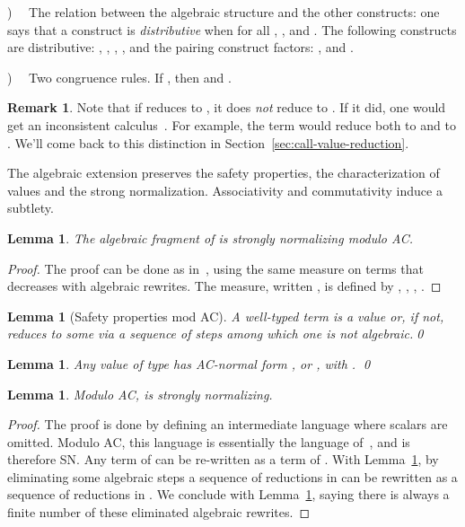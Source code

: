 \documentclass[10pt]{article}
\theoremstyle{plain}
\newtheorem{lemma}[theorem]{Lemma}
\theoremstyle{definition}
\newtheorem{remark}[theorem]{Remark}
\newcommand{\define}[1]{{\em #1}}
\begin{document}
\smallskip
{})~~
 The relation between the algebraic structure and the other
  constructs: one says that a construct  is
  \define{distributive} when for all , , 
   and 
  .
The following constructs are distributive:
,
,
,
,
and the pairing construct factors: 
, 
 and
.

\smallskip
{})~~
 Two congruence rules. If , then 
  and .

\begin{remark}\label{rem:red-strat}
  Note that if  reduces to
  , it does {\em not} reduce to
  . If it did, one would get an
  inconsistent calculus~\cite{ad08}. For example, the term  would reduce both to
   and to
  .
  We'll come back to this distinction in Section~\ref{sec:call-value-reduction}.
\end{remark}

The algebraic extension preserves the safety properties, the
characterization of values and the strong normalization.
Associativity and commutativity induce a subtlety.

\begin{lemma}
  \label{lem:sn-AC}
  The algebraic fragment of  is strongly
  normalizing modulo AC.
\end{lemma}

\begin{proof}
  The proof can be done as in~\cite{ad08}, using the same measure on
  terms that decreases with algebraic rewrites. The measure, written
  , is defined by , ,
  , .
\end{proof}

\begin{lemma}[Safety properties mod AC]
  \label{lem:safety-prop-alg-modAC}
  A well-typed term  is a value or, if not,
  reduces to some  via a sequence of steps among
  which one is {\em not} algebraic.\qed
\end{lemma}


\begin{lemma}
  \label{lem:uniq-value-alg}
  Any value of type  has AC-normal form ,  or
  , with .
  \qed
\end{lemma}

\begin{lemma}
  \label{lem:sn-alg}
  Modulo AC,  is strongly normalizing.
\end{lemma}

\begin{proof}
  The proof is done by defining an intermediate language  where scalars are omitted. Modulo AC, this language is
  essentially the language 
  of~\cite{groote94}, and is therefore SN. Any term of  can be re-written as a term of . With
  Lemma~\ref{lem:safety-prop-alg-modAC}, by eliminating some algebraic
  steps a sequence of reductions in  can be
  rewritten as a sequence of reductions in . We
  conclude with Lemma~\ref{lem:sn-AC}, saying there is always a finite
  number of these eliminated algebraic rewrites.
\end{proof}
\end{document}
